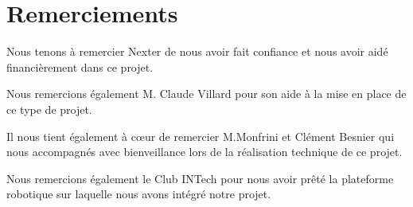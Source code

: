 \section*{Remerciements}

\tab Nous tenons à remercier Nexter de nous avoir fait confiance et nous avoir aidé financièrement dans ce projet. 

\tab Nous remercions également M. Claude Villard pour son aide à la mise en place de ce type de projet.

\tab Il nous tient également à cœur de remercier M.Monfrini et Clément Besnier qui nous accompagnés avec bienveillance lors de la réalisation technique de ce projet.

\tab Nous remercions également le Club INTech pour nous avoir prêté la plateforme robotique sur laquelle nous avons intégré notre projet.